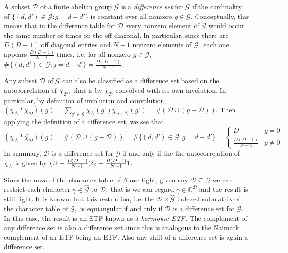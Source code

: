 \documentclass[3p,11pt]{elsarticle}
\newcommand{\bbC}{\mathbb{C}}
\newcommand{\bbF}{\mathbb{F}}
\newcommand{\bfone}{\boldsymbol{1}}
\newcommand{\calD}{\mathcal{D}}
\newcommand{\calG}{\mathcal{G}}
\newcommand{\tr}{\operatorname{tr}}
\theoremstyle{definition}
\begin{document}
A subset $\calD$ of a finite abelian group $\calG$ is a \textit{difference set} for $\calG$ if the cardinality of $\{(d,d')\in\calG: g=d-d'\}$ is constant over all nonzero $g\in\calG.$ Conceptually, this means that in the difference table for $\calD$ every nonzero element of $\calG$ would occur the same number of times on the off diagonal. In particular, since there are $D(D-1)$ off diagonal entries and $N-1$ nonzero elements of $\calG,$ each one appears $\tfrac{D(D-1)}{N-1}$ times, i.e. for all nonzero $g\in\calG,$ $\#\{(d,d')\in\calG: g=d-d'\}=\tfrac{D(D-1)}{N-1}$.

Any subset $\calD$ of $\calG$ can also be classified as a difference set based on the autocorrelation of $\chi_\calD,$ that is by $\chi_\calD$ convolved with its own involution. In particular, by definition of involution and convolution, $(\chi_\calD*\tilde{\chi}_\calD)(g)=\sum_{g'\in\calG}\chi_{\calD}(g')\chi_{g+\calD}(g')=\#(\calD\cup(g+\calD)).$ Then applying the definition of a difference set, we see that 
\begin{equation*}
    (\chi_\calD*\tilde{\chi_\calD})(g)=\#(\calD\cup(g+\calD))=\#\{(d,d')\in\calG: g=d-d'\}=\left\{\begin{array}{lc}
    D & g=0 \\
    \tfrac{D(D-1)}{N-1} & g\not=0 
    \end{array}\right..
\end{equation*}
In summary, $\calD$ is a difference set for $\calG$ if and only if the the autocorrelation of $\chi_\calD$ is given by $\smash{(D-\tfrac{D(D-1)}{N-1})\delta_0+\tfrac{D(D-1)}{N-1}\bfone}.$

Since the rows of the character table of $\calG$ are tight, given any $\calD\subseteq\calG$ we can restrict each character $\gamma\in\hat{\calG}$ to $\calD,$ that is we can regard $\gamma\in\bbC^\calD$ and the result is still tight. It is known that this restriction, i.e. the $\calD\times\hat{\calG}$ indexed submatrix of the character table of $\calG,$ is equiangular if and only if $\calD$ is a difference set for $\calG.$ In this case, the result is an ETF known as a \textit{harmonic ETF.} The complement of any difference set is also a difference set since this is analogous to the Naimark complement of an ETF being an ETF. Also any shift of a difference set is again a difference set.



\end{document}
